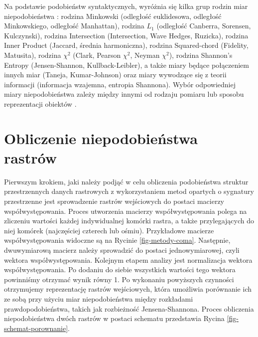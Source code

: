 \documentclass{amuthesis}
\begin{document}
Na podstawie podobieństw syntaktycznych, wyróżnia się kilka grup rodzin
miar niepodobieństwa \autocite{Cha2007}: rodzina Minkowski (odległość
euklidesowa, odległość Minkowskiego, odległość Manhattan), rodzina
\(L_1\) (odległość Canberra, Sorensen, Kulczynski), rodzina Intersection
(Intersection, Wave Hedges, Ruzicka), rodzina Inner Product (Jaccard,
średnia harmoniczna), rodzina Squared-chord (Fidelity, Matusita),
rodzina \(\chi^2\) (Clark, Pearson \(\chi^2\), Neyman \(\chi^2\)),
rodzina Shannon's Entropy (Jensen-Shannon, Kullback-Leibler), a także
miary będące połączeniem innych miar (Taneja, Kumar-Johnson) oraz miary
wywodzące się z teorii informacji (informacja wzajemna, entropia
Shannona). Wybór odpowiedniej miary niepodobieństwa zależy między innymi
od rodzaju pomiaru lub sposobu reprezentacji obiektów
\autocite{Cha2007}.

\hypertarget{obliczenie-niepodobieux144stwa-rastruxf3w}{%
\section{Obliczenie niepodobieństwa
rastrów}\label{obliczenie-niepodobieux144stwa-rastruxf3w}}

Pierwszym krokiem, jaki należy podjąć w celu obliczenia podobieństwa
struktur przestrzennych danych rastrowych z wykorzystaniem metod
opartych o sygnatury przestrzenne jest sprowadzenie rastrów wejściowych
do postaci macierzy współwystępowania. Proces utworzenia macierzy
współwystępowania polega na zliczeniu wartości każdej indywidualnej
komórki rastra, a także przylegających do niej komórek (najczęściej
czterech lub ośmiu). Przykładowe macierze współwystępowania widoczne są
na Rycinie \ref{fig-metody-coma}. Następnie, dwuwymiarową macierz należy
sprowadzić do postaci jednowymiarowej, czyli wektora współwystępowania.
Kolejnym etapem analizy jest normalizacja wektora współwystępowania. Po
dodaniu do siebie wszystkich wartości tego wektora powinniśmy otrzymać
wynik równy 1. Po wykonaniu powyższych czynności otrzymujemy
reprezentację rastrów wejściowych, która umożliwia porównanie ich ze
sobą przy użyciu miar niepodobieństwa między rozkładami
prawdopodobieństwa, takich jak rozbieżność Jensena-Shannona. Proces
obliczenia niepodobieństwa dwóch rastrów w postaci schematu przedstawia
Rycina \ref{fig-schemat-porownanie}.
\end{document}
